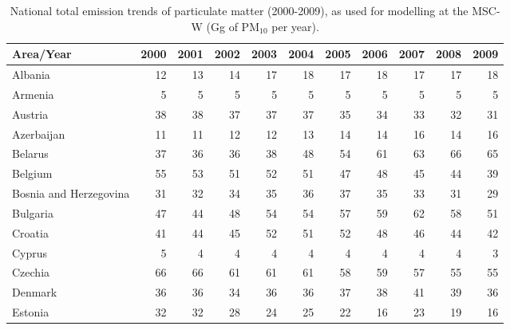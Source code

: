  
 \begin{table}
 \caption{National total emission trends of particulate matter (2000-2009), as used for modelling at the MSC-W (Gg of PM$_{10}$ per year).}
 
 \vspace{15pt}
 
 \scriptsize
 \centering
 \begin{tabular}{|l|r|r|r|r|r|r|r|r|r|r|}
 \hline
                     Area/Year&   2000&   2001&   2002&   2003&   2004&   2005&   2006&   2007&   2008&   2009\\\hline\hline
                       Albania&     12&     13&     14&     17&     18&     17&     18&     17&     17&     18\\\hline
                       Armenia&      5&      5&      5&      5&      5&      5&      5&      5&      5&      5\\\hline
                       Austria&     38&     38&     37&     37&     37&     35&     34&     33&     32&     31\\\hline
                    Azerbaijan&     11&     11&     12&     12&     13&     14&     14&     16&     14&     16\\\hline
                       Belarus&     37&     36&     36&     38&     48&     54&     61&     63&     66&     65\\\hline
                       Belgium&     55&     53&     51&     52&     51&     47&     48&     45&     44&     39\\\hline
        Bosnia and Herzegovina&     31&     32&     34&     35&     36&     37&     35&     33&     31&     29\\\hline
                      Bulgaria&     47&     44&     48&     54&     54&     57&     59&     62&     58&     51\\\hline
                       Croatia&     41&     44&     45&     52&     51&     52&     48&     46&     44&     42\\\hline
                        Cyprus&      5&      4&      4&      4&      4&      4&      4&      4&      4&      3\\\hline
                       Czechia&     66&     66&     61&     61&     61&     58&     59&     57&     55&     55\\\hline
                       Denmark&     36&     36&     34&     36&     36&     37&     38&     41&     39&     36\\\hline
                       Estonia&     32&     32&     28&     24&     25&     22&     16&     23&     19&     16\\\hline

\end{tabular}
\end{table}
